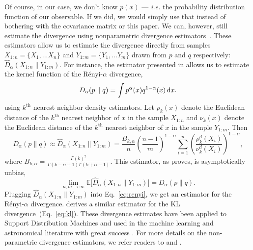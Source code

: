 \documentclass[12pt, letterpaper, preprint]{aastex}
\newcommand{\beq}{\begin{equation}}
\newcommand{\eeq}{\end{equation}}
\begin{document}
Of course, in our case, we don't know $p(x)$ --- \emph{i.e.} the probability distribution function of
our observable. If we did, we would simply use that instead of bothering with 
the covariance matrix or this paper. We can, however, still estimate the 
divergence using nonparametric divergence estimators~\citep{wang2009, poczos2012, krishnamurthy2014}. 
These estimators allow us to estimate the divergence directly from 
samples $X_{1:n} = \{ X_1, ... X_n \}$ and $Y_{1:m} = \{ Y_1, ... Y_m \}$ 
drawn from $p$ and $q$ respectively: $\hat{D}_{\alpha}(X_{1:n} \parallel Y_{1:m})$. 
For instance, the estimator presented in \cite{poczos2012} allows us to estimate 
the kernel function of the R\'enyi-$\alpha$ divergence,
\beq \label{eq:d_alpha}
D_{\alpha} ( p \parallel q ) = \int p^\alpha(x) q^{1-\alpha}(x)\,{\rm d}x. 
\eeq
using $k^\mathrm{th}$ nearest neighbor density estimators. Let $\rho_k(x)$ 
denote the Euclidean distance of the $k^\mathrm{th}$ nearest neighbor 
of $x$ in the sample $X_{1:n}$ and $\nu_k(x)$ denote the Euclidean distance 
of the $k^\mathrm{th}$ nearest neighbor of $x$ in the sample $Y_{1:m}$. Then 
\beq \label{eq:d_alpha_est}
D_{\alpha}(p \parallel q) \approx \hat{D}_{\alpha}(X_{1:n} \parallel Y_{1:m}) = \frac{B_{k,\alpha}}{n} \left(\frac{n-1}{m}\right)^{1-\alpha}
\sum\limits_{i=1}^{n} \left(\frac{\rho_k^{d}(X_i)}{\nu_k^{d}(X_i)} \right)^{1-\alpha},
\eeq
where $B_{k, \alpha} = \frac{\Gamma(k)^2}{\Gamma(k-\alpha+1)\Gamma(k+\alpha-1)}$. 
This estimator, as \cite{poczos2012} proves, is asymptotically unbias,
\beq
\lim_{n, m \rightarrow \infty} \mathbb{E} \big[ \hat{D}_{\alpha} (X_{1:n} \parallel Y_{1:m}) \big] = D_{\alpha} (p \parallel q).
\eeq
Plugging $\hat{D}_{\alpha}(X_{1:n} \parallel Y_{1:m})$ into Eq.~\ref{eq:renyi},
we get an estimator for the R\'enyi-$\alpha$ divergence. \cite{wang2009} derives
a similar estimator for the KL divergence~(Eq.~\ref{eq:kl}). 
These divergence estimates have been applied to Support Distribution Machines 
and used in the machine learning and astronomical literature with great success
\citep[\emph{e.g.}][]{poczos2011, poczos2012, poczos2012a, poczos2012b, xu2013, ntampaka2015, ntampaka2016, ravanbakhsh2017a}.
For more details on the non-parametric divergence estimators, we refer readers to 
\cite{poczos2012} and \cite{krishnamurthy2014}.
\end{document}

